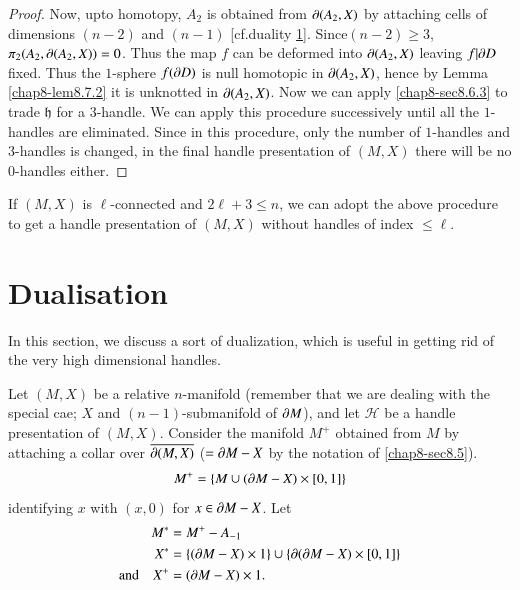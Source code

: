 \begin{proof}
Now, upto homotopy, $A_{2}$ is obtained from $\partial (A_{2},X)$ by attaching cells of dimensions $(n-2)$ and $(n-1)$ [cf.\@ duality \ref{chap8-sec8.8}].
Since\pageoriginale $(n-2)\geq 3$, $\pi_{2}(A_{2},\partial(A_{2},X))=0$. Thus the map $f$ can be deformed into $\partial (A_{2},X)$ leaving $f|\partial D$ fixed. Thus the $1$-sphere $f(\partial D)$ is null homotopic in $\partial(A_{2},X)$, hence by Lemma \ref{chap8-lem8.7.2} it is unknotted in $\partial(A_{2},X)$. Now we can apply \ref{chap8-sec8.6.3} to trade $\mathfrak{h}$ for a $3$-handle. We can apply this procedure successively until all the $1$-handles are eliminated. Since in this procedure, only the number of $1$-handles and $3$-handles is changed, in the final handle presentation of $(M,X)$ there will be no $0$-handles either.
\end{proof}

\begin{remark*}
If $(M,X)$ is $\ell$-connected and $2\ell +3\leq n$, we can adopt the above procedure to get a handle presentation of $(M,X)$ without handles of index $\leq\ell$. 
\end{remark*}

\section{Dualisation}\label{chap8-sec8.8}

In this section, we discuss a sort of dualization, which is useful in getting rid of the very high dimensional handles.

Let $(M,X)$ be a relative $n$-manifold (remember that we are dealing with the special cae; $X$ and $(n-1)$-submanifold of $\partial M$), and let $\mathscr{H}$ be a handle presentation of $(M,X)$. Consider the manifold $M^{+}$ obtained from $M$ by attaching a collar over $\overline{\partial (M,X)}$ ($=\partial M-X$ by the notation of \ref{chap8-sec8.5}).
$$
M^{+}=\{M\cup (\partial M-X)\times [0,1]\}
$$
identifying $x$ with $(x,0)$ for $x\in \partial M-X$. Let
\begin{align*}
M^{*} &= M^{+}-A_{-1}\\
X^{*} &= \{(\partial M-X)\times 1\}\cup \{\partial (\partial M-X)\times [0,1]\}\\
\text{and}\quad X^{+} &= (\partial M-X) \times 1.
\end{align*}

